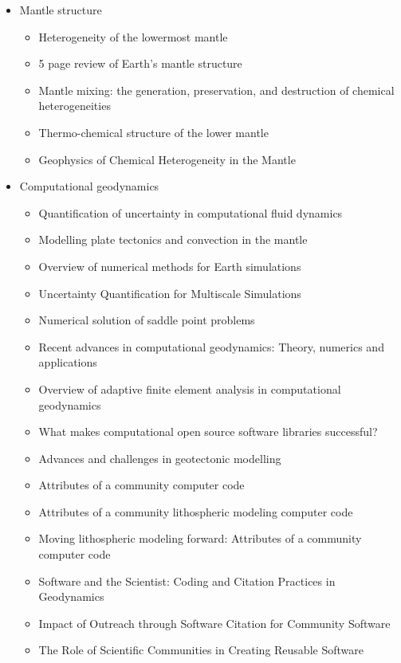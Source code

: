 \begin{itemize}
\item Mantle structure
   \begin{itemize}
   \item [\twothousand] Heterogeneity of the lowermost mantle \cite{garn00}
   \item [\twothousandone] 5 page review of Earth's mantle structure \cite{hewo01}
   \item [\twothousandtwo] Mantle mixing: the generation, preservation, and destruction of chemical heterogeneities \cite{vahb02}
   \item [\twothousandseven] Thermo-chemical structure of the lower mantle \cite{dett07}
   \item [\twothousandtwelve] Geophysics of Chemical Heterogeneity in the Mantle \cite{stli12}
   \end{itemize}

\item Computational geodynamics
   \begin{itemize}
   \item [\nineteenninetyseven] Quantification of uncertainty in computational fluid dynamics \cite{roac97}
   \item [\twothousand] Modelling plate tectonics and convection in the mantle \cite{mogz00}
   \item [\twothousandone] Overview of numerical methods for Earth simulations \cite{momd01}
   \item [\twothousandtwo] Uncertainty Quantification for Multiscale Simulations \cite{degg02}
   \item [\twothousandfive] Numerical solution of saddle point problems \cite{begl05}
   \item [\twothousandeight] Recent advances in computational geodynamics: Theory, numerics and applications \cite{kags08}
   \item [\twothousandthirteen] Overview of adaptive finite element analysis in computational geodynamics \cite{masm13}
   \item [\twothousandthirteen] What makes computational open source software libraries successful? \cite{bahe13}
   \item [\twothousandfourteen] Advances and challenges in geotectonic modelling \cite{bufy14}
   \item [\twothousandfifteen] Attributes of a community computer code \cite{comc15}
   \item [\twothousandfifteen] Attributes of a community lithospheric modeling computer code \cite{comc15}
   \item [\twothousandfifteen] Moving lithospheric modeling forward: Attributes of a community computer code \cite{comc15}
   \item [\twothousandseventeen] Software and the Scientist: Coding and Citation Practices in Geodynamics \cite{hwfs17}
   \item [\twothousandnineteen] Impact of Outreach through Software Citation for Community Software \cite{hwpc19}
   \item [\twothousandnineteen] The Role of Scientific Communities in Creating Reusable Software \cite{kehg19}
   \end{itemize}


\end{itemize}
